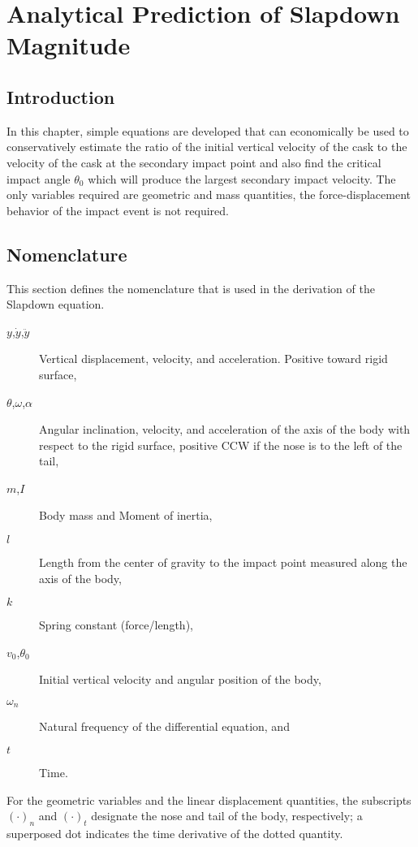 \chapter{Analytical Prediction of Slapdown Magnitude}
\section{Introduction}

In this chapter, simple equations are developed that can economically be
used to conservatively estimate the ratio of the initial vertical
velocity of the cask to the velocity of the cask at the secondary impact
point and also find the critical impact angle $\theta_0$ which will
produce the largest secondary impact velocity. The only variables
required are geometric and mass quantities, the force-displacement
behavior of the impact event is not required. 

\section{Nomenclature}

This section defines the nomenclature that is used in the derivation
of the Slapdown equation.  
\begin{description}
\item[$y$,$\dot y$,$\ddot y$] Vertical displacement, velocity, and
acceleration.  Positive toward rigid surface,
\item[$\theta$,$\omega$,$\alpha$] Angular inclination, velocity, and
acceleration of the axis of the body with respect
to the rigid surface, positive CCW if the nose is to the left of the tail,
\item[$m$,$I$]   Body mass and Moment of inertia,
\item[$l$]       Length from the center of gravity to the impact point
measured along the axis of the body,
\item[$k$]       Spring constant (force/length),
\item[$v_0$,$\theta_0$]     Initial vertical velocity and angular
position of the body, 
\item[$\omega_n$] Natural frequency of the differential equation, and 
\item[$t$]        Time.
\end{description}
For the geometric variables and the linear displacement quantities, the
subscripts $(\cdot)_n$ and $(\cdot)_t$ designate the nose and tail 
of the body, respectively; a superposed dot indicates the time
derivative of the dotted quantity.

